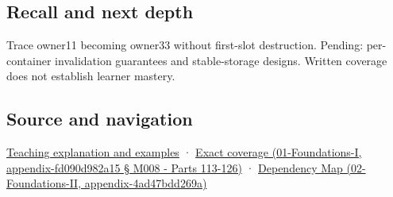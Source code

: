 \subsection{Recall and next depth}\label{recall-and-next-depth}

Trace owner11 becoming owner33 without first-slot destruction. Pending: per-container invalidation guarantees and stable-storage designs. Written coverage does not establish learner mastery.

\subsection{Source and navigation}\label{source-and-navigation}

\href{Continuous\%20Notes/Computing\%20Foundations\%20-\%20From\%20Bits\%20to\%20C++\%20and\%20Systems\%20APIs\#When\%20a\%20valid\%20borrow\%20stops\%20naming\%20the\%20intended\%20thing}{Teaching explanation and examples} · \href{}{Exact coverage (01-Foundations-I, appendix-fd090d982a15 § M008 - Parts 113-126)} · \href{}{Dependency Map (02-Foundations-II, appendix-4ad47bdd269a)}
